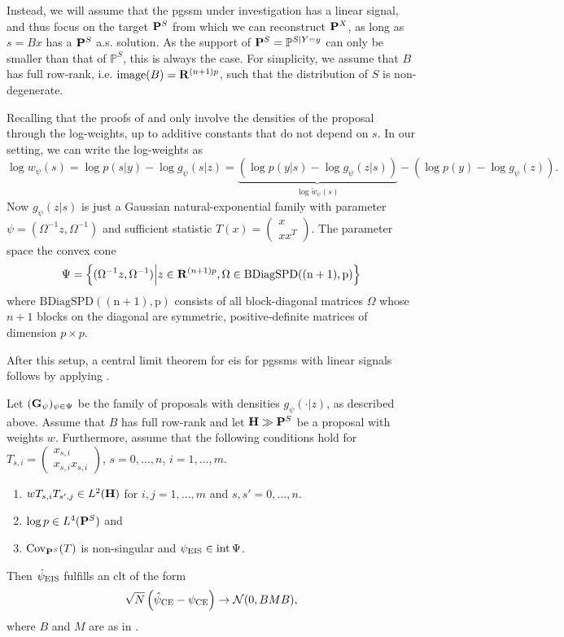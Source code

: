 Instead, we will assume that the \gls{pgssm} under investigation has a linear signal, and thus focus on the target $\P^{S}$ from which we can reconstruct $\P^{X}$, as long as $s = Bx$ has a $\P^{S}$ a.s. solution.
As the support of $\P^{S} = \mathbb P^{S | Y = y}$ can only be smaller than that of $\mathbb P^{S}$, this is always the case. For simplicity, we assume that $B$ has full row-rank, i.e. $\operatorname{image}(B) = \R^{(n+1)p}$, such that the distribution of $S$ is non-degenerate.

Recalling that the proofs of  and  only involve the densities of the proposal through the log-weights, up to additive constants that do not depend on $s$. In our setting, we can write the log-weights as 
$$
    \log w_{\psi}(s) = \log p(s|y) - \log g_{\psi}(s|z) = \underbrace{\left(\log p(y|s) - \log  g_{\psi}(z|s)\right)}_{\log \tilde w_\psi(s)} - (\log p(y) -  \log g_\psi(z)).
$$
Now $g_{\psi}(z|s)$ is just a Gaussian natural-exponential family with parameter $\psi = (\Omega^{-1}z, \Omega^{-1})$ and sufficient statistic $T(x) = \begin{pmatrix} x\\xx^{T} \end{pmatrix}$. The parameter space the convex cone 
$$
    \Psi = \left\{ (\Omega^{-1}z, \Omega^{-1}) \middle|
        z \in \R^{(n+1)p}, \Omega \in \operatorname{BDiagSPD((n+1),p)}
    \right\}
$$
where $\operatorname{BDiagSPD((n+1),p)}$ consists of all block-diagonal matrices $\Omega$ whose $n+1$ blocks on the diagonal are symmetric, positive-definite matrices of dimension $p\times p$.

After this setup, a central limit theorem for \gls{eis} for \glspl{pgssm} with linear signals follows by applying . 

\begin{theorem}
    \label{thm:eis_clt_ssm}

    Let $(\G_{\psi})_{\psi\in\Psi}$ be the family of proposals with densities $g_{\psi}(\cdot|z)$, as described above. Assume that $B$ has full row-rank and let $\H \gg \P^{S}$ be a proposal with weights $w$. Furthermore, assume that the following conditions hold for $T_{s,i} = \begin{pmatrix}
        x_{s,i} \\
        x_{s,i}x_{s,i}
    \end{pmatrix}$, $s = 0, \dots, n$, $i=1,\dots,m$.

    \begin{enumerate}
        \item $wT_{s,i}T_{s',j} \in L^{2}(\H)$ for $i,j = 1,\dots, m$ and $s,s' = 0, \dots, n$.
        \item $\log p \in L^{4}(\P^{S})$ and
        \item $\cov _{\P^{S}}(T)$ is non-singular and $\peis \in \operatorname{int} \Psi$. 
    \end{enumerate}

    Then $\hpeis$ fulfills an \gls{clt} of the form 
    $$
        \sqrt{N} \left( \hpce - \pce \right) \to \mathcal N (0, BMB),
    $$
    where $B$ and $M$ are as in .
\end{theorem}

